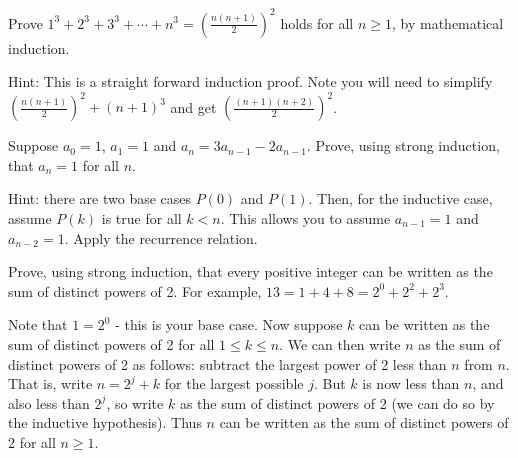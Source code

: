 \begin{questions}
\begin{answer}
	\end{answer}




\question Prove $1^3 + 2^3 + 3^3 + \cdots + n^3 = \left(\frac{n(n+1)}{2}\right)^2$ holds for all $n \ge 1$, by mathematical induction.

	\begin{answer}
		Hint: This is a straight forward induction proof.  Note you will need to simplify $\left(\frac{n(n+1)}{2}\right)^2 + (n+1)^3$ and get $\left(\frac{(n+1)(n+2)}{2}\right)^2$.
	\end{answer}
	



\question Suppose $a_0 = 1$, $a_1 = 1$ and $a_n = 3a_{n-1} - 2a_{n-1}$.  Prove, using strong induction, that $a_n = 1$ for all $n$.

	\begin{answer}
		Hint: there are two base cases $P(0)$ and $P(1)$.  Then, for the inductive case, assume $P(k)$ is true for all $k < n$.  This allows you to assume $a_{n-1} = 1$ and $a_{n-2} = 1$.  Apply the recurrence relation.
	\end{answer}
	
	
	



\question Prove, using strong induction, that every positive integer can be written as the sum of distinct powers of 2.  For example, $13 = 1 + 4 + 8 = 2^0 + 2^2 + 2^3$.

	\begin{answer}
		Note that $1 = 2^0$ - this is your base case.  Now suppose $k$ can be written as the sum of distinct powers of 2 for all $1\le k \le n$.  We can then write $n$ as the sum of distinct powers of 2 as follows: subtract the largest power of 2 less than $n$ from $n$.  That is, write $n = 2^j + k$ for the largest possible $j$.  But $k$ is now less than $n$, and also less than $2^j$, so write $k$ as the sum of distinct powers of 2 (we can do so by the inductive hypothesis).  Thus $n$ can be written as the sum of distinct powers of 2 for all $n \ge 1$.
	\end{answer}
	

\end{questions}
